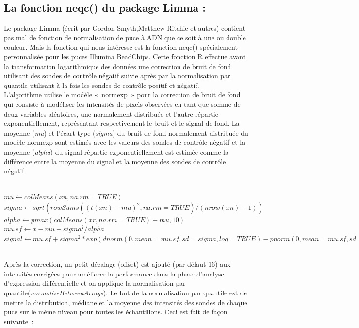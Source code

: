 \documentclass[a4paper,10pt]{article}
\begin{document}
\subsection{La fonction neqc() du package Limma :}
Le package Limma (écrit par Gordon Smyth,Matthew Ritchie et autres) contient pas mal de fonction de normalisation de puce à ADN que ce soit à une ou double couleur. Mais la fonction qui nous intéresse est la fonction neqc() spécialement personnalisée pour les puces Illumina BeadChips.
Cette fonction R effectue avant la transformation logarithmique des données une correction de bruit de fond utilisant des sondes de contrôle négatif suivie après par la normalisation par quantile utilisant à la fois les sondes de contrôle positif et négatif.
\\L’algorithme utilise le modèle « normexp » pour la correction de bruit de fond qui consiste à modéliser les intensités de pixels observées en tant que somme de deux variables aléatoires, une normalement distribuée et l’autre répartie exponentiellement, représentant respectivement le bruit et le signal de fond. 
La moyenne (\emph{mu}) et l’écart-type (\emph{sigma}) du bruit de fond normalement distribuée du modèle normexp sont estimés avec les valeurs des sondes de contrôle négatif et  la moyenne (\emph{alpha}) du signal répartie exponentiellement est estimée comme la différence entre la moyenne du signal et la moyenne des sondes de contrôle négatif.
\begin{scriptsize}
 \\$mu \leftarrow colMeans(xn, na.rm = TRUE)$
 \\$sigma \leftarrow sqrt(rowSums((t(xn) - mu)^2, na.rm = TRUE)/(nrow(xn) - 1))$
 \\$alpha \leftarrow pmax(colMeans(xr, na.rm = TRUE) - mu, 10)$
 \\$mu.sf \leftarrow x - mu - sigma^2/alpha$
 \\$signal \leftarrow mu.sf + sigma^2 * exp(dnorm(0, mean = mu.sf, sd = sigma, log = TRUE) - pnorm(0, mean = mu.sf, sd = sigma, lower.tail = FALSE, log.p = TRUE))$
\end{scriptsize}
\\Après la correction, un petit décalage (offset) est ajouté (par défaut 16) aux intensités corrigées pour  améliorer la performance dans la phase d’analyse d’expression différentielle et on applique la normalisation par quantile(\emph{normalizeBetweenArrays}).
Le but de la normalisation par quantile est de mettre la distribution, médiane et la moyenne des intensités des sondes de chaque puce sur le même niveau pour toutes les échantillons. Ceci est fait de façon suivante :
\end{document}

